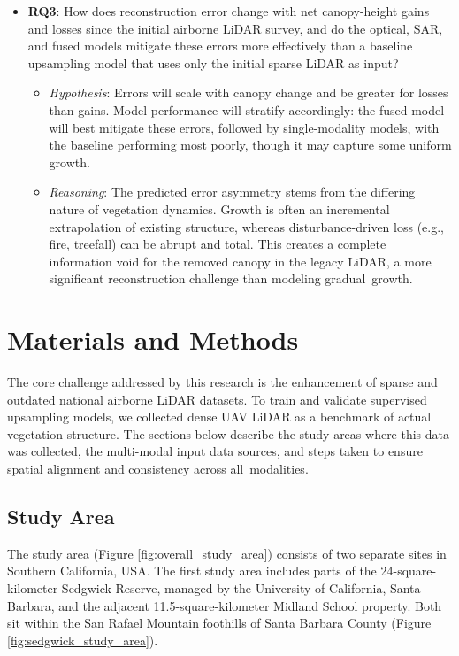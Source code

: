 \documentclass[12pt]{report}
\begin{document}
\begin{itemize}
  \item \textbf{RQ3}: How does reconstruction error change with net canopy-height gains and losses since the initial airborne LiDAR survey, and do the optical, SAR, and fused models mitigate these errors more effectively than a baseline upsampling model that uses only the initial sparse LiDAR as input?
        \begin{itemize}
            \item \textit{Hypothesis}: Errors will scale with canopy change and be greater for losses than gains. Model performance will stratify accordingly: the fused model will best mitigate these errors, followed by single-modality models, with the baseline performing most poorly, though it may capture some uniform growth.
            \item \textit{Reasoning}: The predicted error asymmetry stems from the differing nature of vegetation dynamics. Growth is often an incremental extrapolation of existing structure, whereas disturbance-driven loss (e.g., fire, treefall) can be abrupt and total. This creates a complete information void for the removed canopy in the legacy LiDAR, a more significant reconstruction challenge than modeling \mbox{gradual growth}.
        \end{itemize}
\end{itemize}





\chapter{Materials and Methods}
\chapterstart

The core challenge addressed by this research is the enhancement of sparse and outdated national airborne LiDAR datasets. To train and validate supervised upsampling models, we collected dense UAV LiDAR as a benchmark of actual vegetation structure. The sections below describe the study areas where this data was collected, the multi-modal input data sources, and steps taken to ensure spatial alignment and consistency across \mbox{all modalities}.


\section{Study Area}


The study area (Figure \ref{fig:overall_study_area}) consists of two separate sites in Southern California, USA. The first study area includes parts of the 24-square-kilometer Sedgwick Reserve, managed by the University of California, Santa Barbara, and the adjacent 11.5-square-kilometer Midland School property. Both sit within the San Rafael Mountain foothills of Santa Barbara County (Figure \ref{fig:sedgwick_study_area}).
\end{document}
